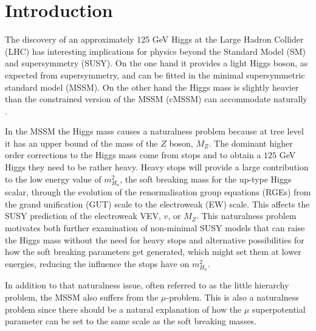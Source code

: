 \documentclass[preprint,amsmath,amssymb,aps,superscriptaddress,prd,showpacs,floatfix,nofootinbib]{revtex4-1}
\begin{document}
\maketitle

\section{\label{sec:intro}Introduction}
The discovery of an approximately 125 GeV Higgs
\cite{Aad:2012tfa,Chatrchyan:2012ufa} at the Large Hadron Collider
(LHC) has interesting implications for physics beyond the Standard
Model (SM) and supersymmetry (SUSY).  On the one hand it provides a
light Higgs boson, as expected from supersymmetry, and
can be fitted in the minimal supersymmetric standard model (MSSM).  On
the other hand the Higgs mass is slightly heavier than the constrained version of the 
MSSM (cMSSM) can accommodate naturally \cite{Cassel:2011zd,Ghilencea:2012gz}.

In the MSSM the Higgs mass causes a naturalness problem because at
tree level it has an upper bound of the mass of the $Z$ boson,
$M_Z$. The dominant higher order corrections to the Higgs mass come
from stops and to obtain a $125$ GeV Higgs they need to be rather
heavy. Heavy stops will provide a large contribution to the low energy
value of $m_{H_u}^2$, the soft breaking mass for the up-type Higgs
scalar, through the evolution of the renormalisation group equations
(RGEs) from the grand unification (GUT) scale to the electroweak (EW)
scale. This affects the SUSY prediction of the electroweak VEV, $v$,
or $M_Z$.  This naturalness problem motivates both further examination
of non-minimal SUSY models that can raise the Higgs mass without the
need for heavy stops and alternative possibilities for how the soft
breaking parameters get generated, which might set them at lower
energies, reducing the influence the stops have on $m_{H_u}^2$.

In addition to that naturalness issue, often referred to as the little
hierarchy problem, the MSSM also suffers from the $\mu$-problem. This
is also a naturalness problem since there should be a natural explanation
of how the $\mu$ superpotential parameter can be set to the same scale
as the soft breaking masses.
\end{document}
